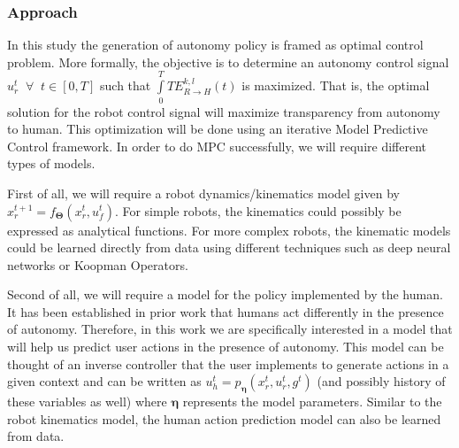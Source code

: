 \documentclass[12pt]{article}
\begin{document}

\subsubsection{Approach}
In this study the generation of autonomy policy is framed as optimal control problem. More formally, the objective is to determine an autonomy control signal 
$u_r^t \;\;\forall \;\; t \in [0, T]$ such that $\int\limits_{0}^{T} TE_{R \rightarrow H}^{k, l}(t)$ is maximized. That is, the optimal solution for the robot control signal will maximize transparency from autonomy to human. This optimization will be done using an iterative Model Predictive Control framework. In order to do MPC successfully, we will require different types of models. 

First of all, we will require a robot dynamics/kinematics model given by $x_r^{t+1} = f_{\boldsymbol{\Theta}}(x_r^t, u_f^t)$. For simple robots, the kinematics could possibly be expressed as analytical functions. For more complex robots, the kinematic models could be learned directly from data using different techniques such as deep neural networks or Koopman Operators. 

Second of all, we will require a model for the policy implemented by the human. It has been established in prior work that humans act differently in the presence of autonomy. Therefore, in this work we are specifically interested in a model that will help us predict user actions in the presence of autonomy. This model can be thought of an inverse controller that the user implements to generate actions in a given context and can be written as $u_h^{t} = p_{\boldsymbol{\eta}}(x_r^t, u_r^t, g^t)$ (and possibly history of these variables as well) where $\boldsymbol{\eta}$ represents the model parameters. Similar to the robot kinematics model, the human action prediction model can also be learned from data.
\end{document}
